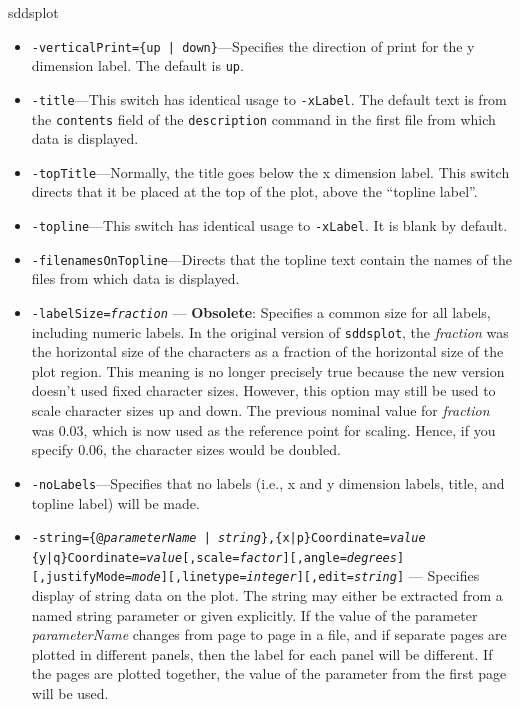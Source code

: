 \begin{sddsprog}{sddsplot}
\begin{itemize}
\begin{itemize}
  \item {\tt -verticalPrint=\{up | down\}}---Specifies the direction of print for the y dimension label.
The default is {\tt up}.

  \item {\tt -title}---This switch has identical usage to {\tt -xLabel}.  The default text is from the {\tt contents}
field of the {\tt description} command in the first file from which data is displayed.  
  \item {\tt -topTitle}---Normally, the title goes below the x dimension label.  This switch directs that it be placed
at the top of the plot, above the ``topline label''.
  \item {\tt -topline}---This switch has identical usage to {\tt -xLabel}.  It is blank by default.
  \item {\tt -filenamesOnTopline}---Directs that the topline text contain the names of the files from which data
is displayed.
  \item {\tt -labelSize={\em fraction}} --- \textbf{Obsolete}:
Specifies a common size for all labels, including numeric labels.  
In the original version of \verb|sddsplot|, the {\em fraction} was the horizontal size of the characters as a 
fraction of the horizontal size of the plot region.  This meaning is no longer precisely true because the
new version doesn't used fixed character sizes.  However, this option may still be used to scale character
sizes up and down.  The previous nominal value for {\em fraction} was 0.03, which is now used as the reference
point for scaling.  Hence, if you specify 0.06, the character sizes would be doubled.  
  \item {\tt -noLabels}---Specifies that no labels (i.e., x and y dimension labels, title, and topline label) will be
made.  

  \item {\tt -string=\{@{\em parameterName} | {\em string}\},\{x|p\}Coordinate={\em value}}
{\tt \{y|q\}Coordinate={\em value}[,scale={\em factor}][,angle={\em degrees}]}
{\tt [,justifyMode={\em mode}][,linetype={\em integer}][,edit={\em string}]} ---
Specifies display of string data on the plot.  The string may either
be extracted from a named string parameter or given explicitly.  If the value of the parameter {\em parameterName} changes
from page to page in a file, and if separate pages are plotted in different panels, then the label for each panel will be
different.  If the pages are plotted together, the value of the parameter from the first page will be used.


\end{itemize}
\end{itemize}
\end{sddsprog}
